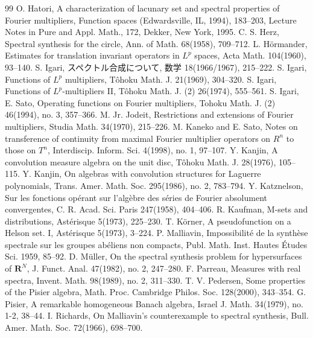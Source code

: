 \begin{thebibliography}{99}
 O. Hatori, A characterization of lacunary set and spectral properties of Fourier multipliers, Function spaces (Edwardsville, IL, 1994), 183--203, Lecture Notes in Pure and Appl. Math., 172, Dekker, New York, 1995.
 C. S. Herz, Spectral synthesis for the circle, Ann. of Math. 68(1958), 709--712.
 L. Hörmander, Estimates for translation invariant operators in $L^{p}$ spaces, Acta Math. 104(1960), 93--140.
 S. Igari, スペクトル合成について, 数学 18(1966/1967), 215--222.
 S. Igari, Functions of $L^{p}$ multipliers, Tôhoku Math. J. 21(1969), 304--320.
 S. Igari, Functions of $L^{p}$-multipliers II, Tôhoku Math. J. (2) 26(1974), 555--561.
 S. Igari, E. Sato, Operating functions on Fourier multipliers, Tohoku Math. J. (2) 46(1994), no. 3, 357--366.
 M. Jr. Jodeit, Restrictions and extensions of Fourier multipliers, Studia Math. 34(1970), 215--226.
 M. Kaneko and E. Sato, Notes on transference of continuity from maximal Fourier multiplier operators on $R^{n}$ to those on $T^{n}$, Interdiscip. Inform. Sci. 4(1998), no. 1, 97--107.
 Y. Kanjin, A convolution measure algebra on the unit disc, Tôhoku Math. J. 28(1976), 105--115.
 Y. Kanjin, On algebras with convolution structures for Laguerre polynomials, Trans. Amer. Math. Soc. 295(1986), no. 2, 783--794.
 Y. Katznelson, Sur les fonctions opérant sur l'algèbre des séries de Fourier absolument convergentes, C. R. Acad. Sci. Paris 247(1958), 404--406.
 R. Kaufman, M-sets and distributions, Astérisque 5(1973), 225--230.
 T. Körner, A pseudofunction on a Helson set. I, Astérisque 5(1973), 3--224.
 P. Malliavin, Impossibilité de la synthèse spectrale sur les groupes abéliens non compacts, Publ. Math. Inst. Hautes Études Sci. 1959, 85--92.
 D. Müller, On the spectral synthesis problem for hypersurfaces of $\mathbf{R}^N$, J. Funct. Anal. 47(1982), no. 2, 247--280.
 F. Parreau, Measures with real spectra, Invent. Math. 98(1989), no. 2, 311--330.
 T. V. Pedersen, Some properties of the Pisier algebra, Math. Proc. Cambridge Philos. Soc. 128(2000), 343--354.
 G. Pisier, A remarkable homogeneous Banach algebra, Israel J. Math. 34(1979), no. 1-2, 38--44.
 I. Richards, On Malliavin's counterexample to spectral synthesis, Bull. Amer. Math. Soc. 72(1966), 698--700.

\end{thebibliography}
